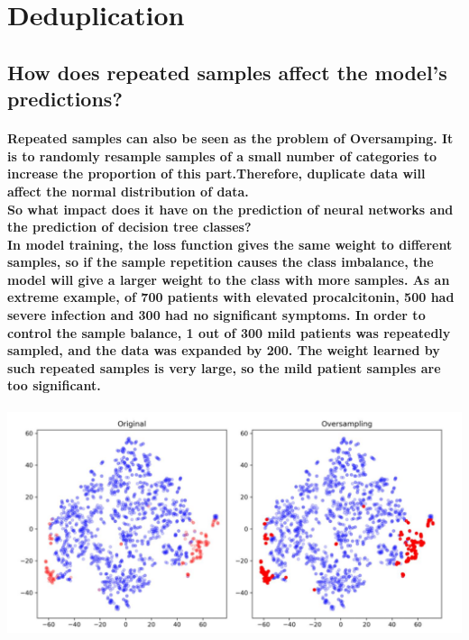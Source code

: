 \documentclass{article}
\begin{document}
\date{}
\maketitle
\section{Deduplication}

\subsection{How does repeated samples affect the model's predictions?}
\paragraph{Repeated samples can also be seen as the problem of Oversamping.
It is to randomly resample samples of a small number of categories to increase the proportion of this part.Therefore, duplicate data will affect the normal distribution of data.\\So what impact does it have on the prediction of neural networks and the prediction of decision tree classes?\\In model training, the loss function gives the same weight to different samples, so if the sample repetition causes the class imbalance, the model will give a larger weight to the class with more samples.
As an extreme example, of 700 patients with elevated procalcitonin, 500 had severe infection and 300 had no significant symptoms. In order to control the sample balance, 1 out of 300 mild patients was repeatedly sampled, and the data was expanded by 200. The weight learned by such repeated samples is very large, so the mild patient samples are too significant.\\}

\includegraphics[scale=0.5]{images/oversampling.png}
\end{document}
